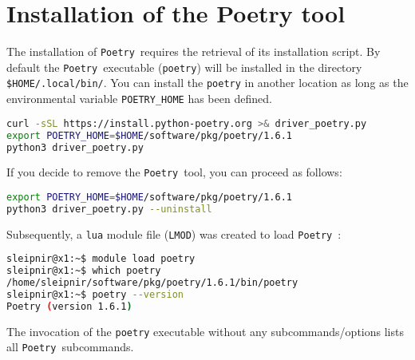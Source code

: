 \documentclass[10pt]{article}
\newcommand{\POETRY}{\texttt{Poetry}}
\begin{document}
\section{Installation of the Poetry tool}
The installation of \POETRY\ requires the retrieval of its installation script. By default the \POETRY\ executable 
(\texttt{poetry}) will be installed in the directory \texttt{\$HOME/.local/bin/}. 
You can install the \texttt{poetry} in another location 
as long as the environmental variable \texttt{POETRY\_HOME} has been defined.
\begin{lstlisting}[language=bash]
curl -sSL https://install.python-poetry.org >& driver_poetry.py
export POETRY_HOME=$HOME/software/pkg/poetry/1.6.1
python3 driver_poetry.py
\end{lstlisting}
If you decide to remove the \POETRY\ tool, you can proceed as follows:
\begin{lstlisting}[language=bash]
export POETRY_HOME=$HOME/software/pkg/poetry/1.6.1
python3 driver_poetry.py --uninstall
\end{lstlisting}
Subsequently, a \texttt{lua} module file (\texttt{LMOD}) was created to load \POETRY\ :
\begin{lstlisting}[language=bash]
sleipnir@x1:~$ module load poetry
sleipnir@x1:~$ which poetry
/home/sleipnir/software/pkg/poetry/1.6.1/bin/poetry
sleipnir@x1:~$ poetry --version
Poetry (version 1.6.1)
\end{lstlisting}
The invocation of the \texttt{poetry} executable without any subcommands/options lists all \POETRY\ subcommands.
\end{document}
